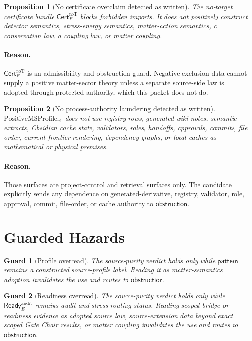 \documentclass[11pt]{article}
\newcommand{\PMSProf}{\mathrm{PositiveMSProfile}_{v1}}
\newcommand{\Ready}{\mathsf{Ready}^{\mathrm{audit}}_E}
\newcommand{\Cert}{\mathsf{Cert}^{\mathrm{noT}}_E}
\newcommand{\Pattern}{\mathsf{pattern}}
\newcommand{\Obstruction}{\mathsf{obstruction}}
\newtheorem{proposition}{Proposition}
\newtheorem{guard}{Guard}
\begin{document}
\begin{proposition}[No certificate overclaim detected as written]
The no-target certificate bundle \(\Cert\) blocks forbidden imports. It does
not positively construct detector semantics, stress-energy semantics,
matter-action semantics, a conservation law, a coupling law, or matter
coupling.
\end{proposition}

\paragraph{Reason.}
\(\Cert\) is an admissibility and obstruction guard. Negative exclusion data
cannot supply a positive matter-sector theory unless a separate source-side
law is adopted through protected authority, which this packet does not do.

\begin{proposition}[No process-authority laundering detected as written]
\(\PMSProf\) does not use registry rows, generated wiki notes, semantic
extracts, Obsidian cache state, validators, roles, handoffs, approvals,
commits, file order, current-frontier rendering, dependency graphs, or local
caches as mathematical or physical premises.
\end{proposition}

\paragraph{Reason.}
Those surfaces are project-control and retrieval surfaces only. The candidate
explicitly sends any dependence on generated-derivative, registry, validator,
role, approval, commit, file-order, or cache authority to \(\Obstruction\).

\section{Guarded Hazards}

\begin{guard}[Profile overread]
The source-purity verdict holds only while \(\Pattern\) remains a constructed
source-profile label. Reading it as matter-semantics adoption invalidates the
use and routes to \(\Obstruction\).
\end{guard}

\begin{guard}[Readiness overread]
The source-purity verdict holds only while \(\Ready\) remains audit and stress
routing status. Reading scoped bridge or readiness evidence as adopted source
law, source-extension data beyond exact scoped Gate Chair results, or matter
coupling invalidates the use and routes to \(\Obstruction\).
\end{guard}
\end{document}
